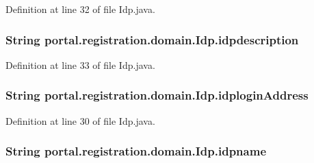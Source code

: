 Definition at line 32 of file Idp.java.

\hypertarget{classportal_1_1registration_1_1domain_1_1Idp_a55fbc92095f6fd9d1fb4c5bd42b18baa}{
\subsubsection[{idpdescription}]{\setlength{\rightskip}{0pt plus 5cm}String {\bf portal.registration.domain.Idp.idpdescription}}}
\label{classportal_1_1registration_1_1domain_1_1Idp_a55fbc92095f6fd9d1fb4c5bd42b18baa}


Definition at line 33 of file Idp.java.

\hypertarget{classportal_1_1registration_1_1domain_1_1Idp_a4690c173d3e4110cd5501e5c7818ae23}{
\subsubsection[{idploginAddress}]{\setlength{\rightskip}{0pt plus 5cm}String {\bf portal.registration.domain.Idp.idploginAddress}}}
\label{classportal_1_1registration_1_1domain_1_1Idp_a4690c173d3e4110cd5501e5c7818ae23}


Definition at line 30 of file Idp.java.

\hypertarget{classportal_1_1registration_1_1domain_1_1Idp_a26fab2dd3a812749a8cef7b376d529f7}{
\subsubsection[{idpname}]{\setlength{\rightskip}{0pt plus 5cm}String {\bf portal.registration.domain.Idp.idpname}}}
\label{classportal_1_1registration_1_1domain_1_1Idp_a26fab2dd3a812749a8cef7b376d529f7}


